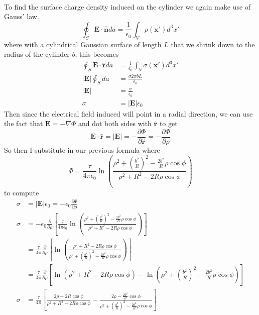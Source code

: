 \documentclass{article}
\begin{document}
\paragraph{}
To find the surface charge density induced on the cylinder we again make use of Gauss' law.
\[ \oint_{S} \mathbf{E}\cdot\mathbf{\hat{n}} da = \frac{1}{\epsilon_{0}} \int_{V} \rho(\mathbf{x'}) d^{3}x' \]
where with a cylindrical Gaussian surface of length $L$ that we shrink down to the radius of the cylinder $b$, this becomes
\begin{align*}
\oint_{S} \mathbf{E}\cdot\mathbf{\hat{r}} da &= \frac{1}{\epsilon_{0}} \int_{V} \sigma(\mathbf{x'}) d^{3}x'\\
\left|  \mathbf{E} \right|\oint_{S}da &= \frac{\sigma 2\pi bL}{\epsilon_{0}}\\
\left|  \mathbf{E} \right| &= \frac{\sigma}{\epsilon_{0}}\\
\sigma &= \left|  \mathbf{E} \right| \epsilon_{0}
\end{align*}
Then since the electrical field induced will point in a radial direction, we can use the fact that $\mathbf{E}=-\nabla\Phi$ and dot both sides with $\mathbf{\hat{r}}$ to get
\[ \mathbf{E}\cdot\mathbf{\hat{r}} = \left|  \mathbf{E} \right| = -\frac{\partial\Phi}{\partial\mathbf{\hat{r}}} = -\frac{\partial\Phi}{\partial\rho} \]
So then I substitute in our previous formula where
\[ \Phi = \boxed{\frac{\tau}{4\pi\epsilon_{0}}\ln\left(\frac{\rho^{2} + (\frac{b^{2}}{R})^{2} - \frac{2b^{2}}{R}\rho\cos\phi}{\rho^{2} + R^{2} - 2R\rho\cos\phi}\right)} \]
to compute
\begin{align*}
\sigma &= \left|  \mathbf{E} \right| \epsilon_{0} = -\epsilon_{0}\frac{\partial\Phi}{\partial\rho}\\
\sigma &= -\epsilon_{0} \frac{\partial}{\partial\rho} \left[ \frac{\tau}{4\pi\epsilon_{0}}\ln\left(\frac{\rho^{2} + (\frac{b^{2}}{R})^{2} - \frac{2b^{2}}{R}\rho\cos\phi}{\rho^{2} + R^{2} - 2R\rho\cos\phi}\right) \right]\\
&= \frac{\tau}{4\pi} \frac{\partial}{\partial\rho} \left[\ln\left(\frac{\rho^{2} + R^{2} - 2R\rho\cos\phi}{\rho^{2} + (\frac{b^{2}}{R})^{2} - \frac{2b^{2}}{R}\rho\cos\phi}\right) \right]\\
&= \frac{\tau}{4\pi} \frac{\partial}{\partial\rho} \left[\ln\left(\rho^{2} + R^{2} - 2R\rho\cos\phi\right) - \ln\left( \rho^{2} + \left(\frac{b^{2}}{R}\right)^{2} - \frac{2b^{2}}{R}\rho\cos\phi \right)\right]\\
\sigma &= \frac{\tau}{4\pi} \left[ \frac{ 2\rho - 2R\cos\phi }{\rho^{2} + R^{2} - 2R\rho\cos\phi} - \frac{2\rho - \frac{2b^{2}}{R}\cos\phi}{\rho^{2} + \left(\frac{b^{2}}{R}\right)^{2} - \frac{2b^{2}}{R}\rho\cos\phi} \right]\\
\end{align*}
\end{document}
